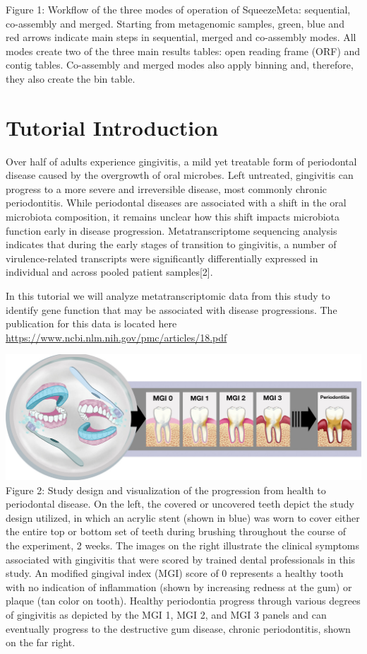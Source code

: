 \documentclass[
]{book}
\begin{document}
Figure 1: Workflow of the three modes of operation of SqueezeMeta: sequential, co-assembly and merged. Starting from metagenomic samples, green, blue and red arrows indicate main steps in sequential, merged and co-assembly modes. All modes create two of the three main results tables: open reading frame (ORF) and contig tables. Co-assembly and merged modes also apply binning and, therefore, they also create the bin table.

\hypertarget{tutorial-introduction}{%
\section{Tutorial Introduction}\label{tutorial-introduction}}

Over half of adults experience gingivitis, a mild yet treatable form of periodontal disease caused by the overgrowth
of oral microbes. Left untreated, gingivitis can progress to a more severe and irreversible disease, most
commonly chronic periodontitis. While periodontal diseases are associated with a shift in the oral microbiota
composition, it remains unclear how this shift impacts microbiota function early in disease progression. Metatranscriptome
sequencing analysis indicates that during the early stages of transition to gingivitis, a number of
virulence-related transcripts were significantly differentially expressed in individual and across pooled patient
samples{[}2{]}.

In this tutorial we will analyze metatranscriptomic data from this study to identify gene function that may be associated
with disease progressions. The publication for this data is located here \url{https://www.ncbi.nlm.nih.gov/pmc/articles/18.pdf}

\includegraphics[width=1\textwidth,height=\textheight]{./Figures/gingivitis.png}
Figure 2: Study design and visualization of the progression from health to periodontal disease. On the left, the covered or uncovered teeth depict the study design utilized, in which an acrylic stent (shown in blue) was worn to cover either the entire top or bottom set of teeth during brushing throughout the course of the experiment, 2 weeks. The images on the right illustrate the clinical symptoms associated with gingivitis that were scored by trained dental professionals in this study. An modified gingival index (MGI) score of 0 represents a healthy tooth with no indication of inflammation (shown by increasing redness at the gum) or plaque (tan color on tooth). Healthy periodontia progress through various degrees of gingivitis as depicted by the MGI 1, MGI 2, and MGI 3 panels and can eventually progress to the destructive gum disease, chronic periodontitis, shown on the far right.
\end{document}
